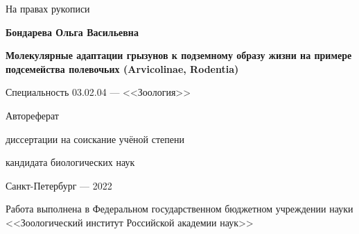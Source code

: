 \def\hrf#1{\hbox to#1{\hrulefill}} %
\newcommand{\sfs}{\fontsize{14pt}{15pt}\selectfont}
\sfs %
\thispagestyle{empty}

\vspace{10mm}
\begin{flushright}
	\Large На правах рукописи 
\end{flushright}

\vspace{30mm}
\begin{center}
{\Large\bf Бондарева Ольга Васильевна}
\end{center}

\vspace{30mm}
\begin{center}
{\bf \LARGE Молекулярные адаптации грызунов к подземному образу жизни на примере подсемейства полевочьих (Arvicolinae, Rodentia)
\par}

\vspace{30mm}
{\Large
Специальность 03.02.04 --- <<Зоология>>
}

\vspace{15mm}
\LARGE Автореферат\par
\Large диссертации на соискание учёной степени\par
кандидата биологических наук
\end{center}

\vspace{40mm}
\begin{center}
{\Large Санкт-Петербург --- 2022}
\end{center}

\newpage
\thispagestyle{empty}
\noindent Работа выполнена в Федеральном государственном бюджетном учреждении науки <<Зоологический институт Российской академии наук>>

